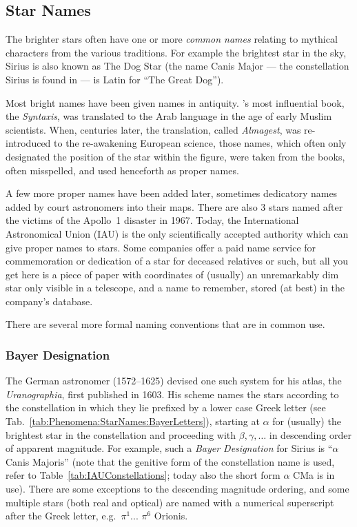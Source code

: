\subsection{Star Names}
\label{sec:Phenomena:StarNames}

The brighter stars often have one or more \emph{common
names} relating to mythical characters from the various traditions. For
example the brightest star in the sky, Sirius is also known as The Dog
Star (the name Canis Major --- the constellation Sirius is found in ---
is Latin for ``The Great Dog''). 

Most bright names have been given names in antiquity. 's most
influential book, the \emph{Syntaxis}, was translated to the Arab
language in the age of early Muslim scientists. When, centuries later,
the translation, called \emph{Almagest}, was re-introduced to the
re-awakening European science, those names, which often only designated
the position of the star within the figure, were taken from the books,
often misspelled, and used henceforth as proper names.

A few more proper names have been added later, sometimes dedicatory
names added by court astronomers into their maps. There are also 3
stars named after the victims of the Apollo~1 disaster in 1967.
Today, the International Astronomical Union (IAU) is the only
scientifically accepted authority which can give proper names to
stars. Some companies offer a paid name service for commemoration or
dedication of a star for deceased relatives or such, but all you get
here is a piece of paper with coordinates of (usually) an unremarkably
dim star only visible in a telescope, and a name to remember, stored
(at best) in the company's database.

There are several more formal naming conventions that are in common use.

\subsubsection{Bayer Designation}
\label{sec:Phenomena:StarNames:Bayer}

The German astronomer  (1572--1625) devised one
such system for his atlas, the \emph{Uranographia}, first published in
1603. His scheme names the stars according to the constellation in
which they lie prefixed by a lower case Greek letter (see
Tab.~\ref{tab:Phenomena:StarNames:BayerLetters}), starting at $\alpha$
for (usually) the brightest star in the constellation and proceeding
with $\beta, \gamma, \ldots$ in descending order of apparent
magnitude. For example, such a \emph{Bayer Designation} for Sirius is
``$\alpha$ Canis Majoris'' (note that the genitive form of the
constellation name is used, refer to Table~\ref{tab:IAUConstellations};
today also the short form $\alpha$ CMa is in use).
There are some exceptions to the descending magnitude
ordering, and some multiple stars (both real and optical) are named
with a numerical superscript after the Greek letter, e.g.\ $\pi^1$...
$\pi^6$ Orionis.


